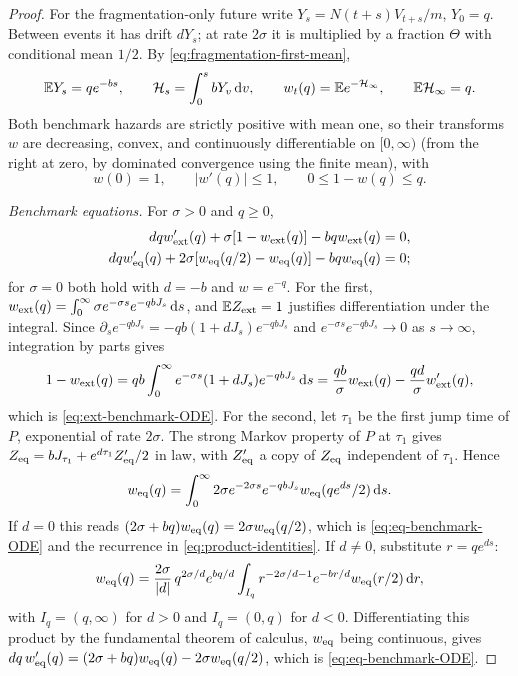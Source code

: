 \begin{proof}
For the fragmentation-only future write
$Y_s=N(t+s)V_{t+s}/m$, $Y_0=q$. Between events it has drift $dY_s$;
at rate $2\sigma$ it is multiplied by a fraction $\Theta$ with
conditional mean $1/2$. By \eqref{eq:fragmentation-first-mean},
\begin{equation}
 \mathbb E Y_s=qe^{-bs},\qquad
 \mathcal H_s=\int_0^s bY_v\,\mathrm d v,\qquad
 w_t(q)=\mathbb E e^{-\mathcal H_\infty},\qquad \mathbb E\mathcal H_\infty=q.
 \label{eq:constant-first-hazard}
\end{equation}
Both benchmark hazards are strictly positive with mean one, so their
transforms $w$ are decreasing, convex, and continuously differentiable
on $[0,\infty)$ (from the right at zero, by dominated convergence
using the finite mean), with
\begin{equation}
 w(0)=1,\qquad |w'(q)|\leq1,\qquad 0\leq1-w(q)\leq q.
 \label{eq:benchmark-regularity}
\end{equation}

\emph{Benchmark equations.} For $\sigma>0$ and $q\geq0$,
\begin{align}
 dq w_{\rm ext}'(q)+\sigma[1-w_{\rm ext}(q)]
                  -bq w_{\rm ext}(q)&=0,\label{eq:ext-benchmark-ODE}\\
 dq w_{\rm eq}'(q)+2\sigma[w_{\rm eq}(q/2)-w_{\rm eq}(q)]
                  -bq w_{\rm eq}(q)&=0;\label{eq:eq-benchmark-ODE}
\end{align}
for $\sigma=0$ both hold with $d=-b$ and $w=e^{-q}$. For the first,
$w_{\rm ext}(q)=\int_0^\infty\sigma e^{-\sigma s}e^{-qbJ_s}\,\mathrm d s$, and
$\mathbb E Z_{\rm ext}=1$ justifies differentiation under the integral.
Since $\partial_se^{-qbJ_s}=-qb(1+dJ_s)e^{-qbJ_s}$ and
$e^{-\sigma s}e^{-qbJ_s}\to0$ as $s\to\infty$, integration by parts
gives
\[
 1-w_{\rm ext}(q)
 =qb\int_0^\infty e^{-\sigma s}(1+dJ_s)e^{-qbJ_s}\,\mathrm d s
 =\frac{qb}\sigma w_{\rm ext}(q)-\frac{qd}\sigma w_{\rm ext}'(q),
\]
which is \eqref{eq:ext-benchmark-ODE}. For the second, let $\tau_1$
be the first jump time of $P$, exponential of rate $2\sigma$. The
strong Markov property of $P$ at $\tau_1$ gives
$Z_{\rm eq}=bJ_{\tau_1}+e^{d\tau_1}Z'_{\rm eq}/2$ in law, with
$Z'_{\rm eq}$ a copy of $Z_{\rm eq}$ independent of $\tau_1$. Hence
\[
 w_{\rm eq}(q)=\int_0^\infty2\sigma e^{-2\sigma s}e^{-qbJ_s}
                w_{\rm eq}(qe^{ds}/2)\,\mathrm d s.
\]
If $d=0$ this reads $(2\sigma+bq)w_{\rm eq}(q)=2\sigma w_{\rm eq}(q/2)$,
which is \eqref{eq:eq-benchmark-ODE} and the recurrence in
\eqref{eq:product-identities}. If $d\neq0$, substitute $r=qe^{ds}$:
\[
 w_{\rm eq}(q)=\frac{2\sigma}{|d|}\,q^{2\sigma/d}e^{bq/d}
   \int_{I_q}r^{-2\sigma/d-1}e^{-br/d}w_{\rm eq}(r/2)\,\mathrm d r,
\]
with $I_q=(q,\infty)$ for $d>0$ and $I_q=(0,q)$ for $d<0$.
Differentiating this product by the fundamental theorem of calculus,
$w_{\rm eq}$ being continuous, gives
$dq\,w_{\rm eq}'(q)=(2\sigma+bq)w_{\rm eq}(q)-2\sigma w_{\rm eq}(q/2)$,
which is \eqref{eq:eq-benchmark-ODE}.


\end{proof}
